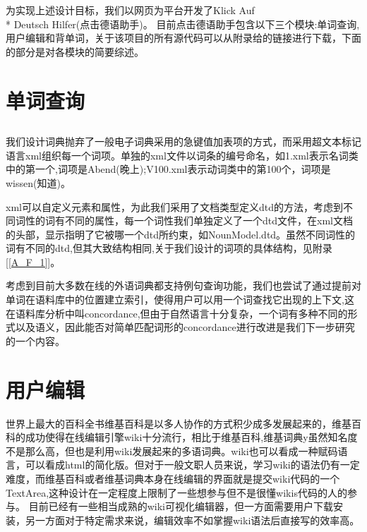 \documentclass[12pt]{article}
\begin{document}
	为实现上述设计目标，我们以网页为平台开发了Klick Auf \\*
	Deutsch Hilfer(点击德语助手)。
目前点击德语助手包含以下三个模块:单词查询,用户编辑和背单词，关于该项目的所有源代码可以从附录\cite{Bib3}给的链接进行下载，下面的部分是对各模块的简要综述。
\section{单词查询}

\subsection{\textbf{}}
	我们设计词典抛弃了一般电子词典采用的急键值加表项的方式，而采用超文本标记语言xml组织每一个词项。单独的xml文件以词条的编号命名，如1.xml表示名词类中的第一个,词项是Abend(晚上);V100.xml表示动词类中的第100个，词项是wissen(知道)。
	
	xml可以自定义元素和属性，为此我们采用了文档类型定义dtd的方法，考虑到不同词性的词有不同的属性，每一个词性我们单独定义了一个dtd文件，在xml文档的头部，显示指明了它被哪一个dtd所约束，如NounModel.dtd。虽然不同词性的词有不同的dtd,但其大致结构相同,关于我们设计的词项的具体结构，见附录[\ref{A_F_1}]。
	
	考虑到目前大多数在线的外语词典都支持例句查询功能，我们也尝试了通过提前对单词在语料库中的位置建立索引，使得用户可以用一个词查找它出现的上下文,这在语料库分析中叫concordance,但由于自然语言十分复杂，一个词有多种不同的形式以及语义，因此能否对简单匹配词形的concordance进行改进是我们下一步研究的一个内容。
\section{用户编辑}
世界上最大的百科全书维基百科是以多人协作的方式积少成多发展起来的，维基百科的成功使得在线编辑引擎wiki十分流行，相比于维基百科,维基词典y虽然知名度不是那么高，但也是利用wiki发展起来的多语词典。wiki也可以看成一种赋码语言，可以看成html的简化版。但对于一般文职人员来说，学习wiki的语法仍有一定难度，而维基百科或者维基词典本身在线编辑的界面就是提交wiki代码的一个TextArea,这种设计在一定程度上限制了一些想参与但不是很懂wikis代码的人的参与。
目前已经有一些相当成熟的wiki可视化编辑器，但一方面需要用户下载安装，另一方面对于特定需求来说，编辑效率不如掌握wiki语法后直接写的效率高。
\end{document}
